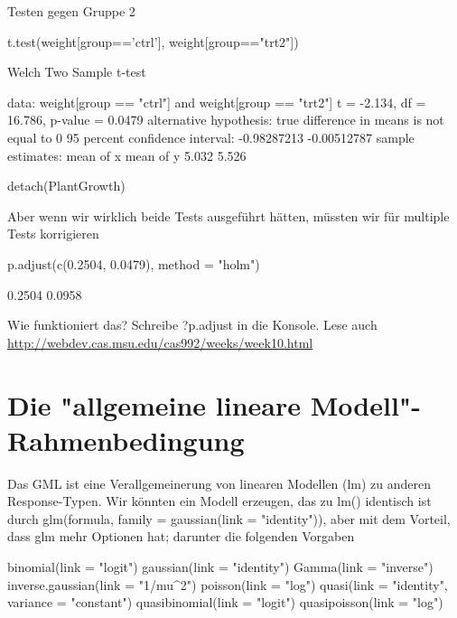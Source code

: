 \documentclass[a4paper,twoside]{tufte-book}\usepackage[]{graphicx}\usepackage[]{color}
\begin{document}
\begin{appendices}
Testen gegen Gruppe 2

\begin{Schunk}
\begin{Sinput}
t.test(weight[group=='ctrl'], weight[group=="trt2"])
\end{Sinput}
\begin{Soutput}

	Welch Two Sample t-test

data:  weight[group == "ctrl"] and weight[group == "trt2"]
t = -2.134, df = 16.786, p-value = 0.0479
alternative hypothesis: true difference in means is not equal to 0
95 percent confidence interval:
 -0.98287213 -0.00512787
sample estimates:
mean of x mean of y 
    5.032     5.526 
\end{Soutput}
\begin{Sinput}
detach(PlantGrowth)
\end{Sinput}
\end{Schunk}

Aber wenn wir wirklich beide Tests ausgeführt hätten, müssten wir für multiple Tests korrigieren

\begin{Schunk}
\begin{Sinput}
p.adjust(c(0.2504, 0.0479), method = "holm")
\end{Sinput}
\begin{Soutput}
[1] 0.2504 0.0958
\end{Soutput}
\end{Schunk}

Wie funktioniert das? Schreibe ?p.adjust in die Konsole. Lese auch \href{das hier}{http://webdev.cas.msu.edu/cas992/weeks/week10.html}

\section{Die "allgemeine lineare Modell"-Rahmenbedingung}

Das GML ist eine Verallgemeinerung von linearen Modellen (lm) zu anderen Response-Typen. Wir könnten ein Modell erzeugen, das zu lm() identisch ist durch glm(formula, family = gaussian(link = "identity")), aber mit dem Vorteil, dass glm mehr Optionen hat; darunter die folgenden Vorgaben

\begin{Schunk}
\begin{Sinput}
binomial(link = "logit")
gaussian(link = "identity")
Gamma(link = "inverse")
inverse.gaussian(link = "1/mu^2")
poisson(link = "log")
quasi(link = "identity", variance = "constant")
quasibinomial(link = "logit")
quasipoisson(link = "log")
\end{Sinput}
\end{Schunk}


\end{appendices}
\end{document}

